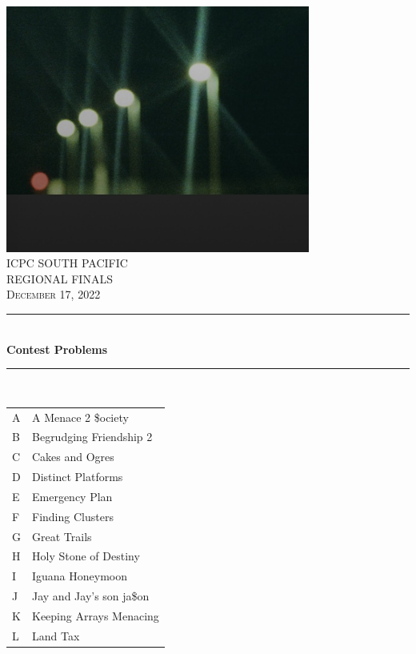 \documentclass[noproblemids,a4paper]{problemset}
\newcommand{\HRule}{\rule{\linewidth}{0.5mm}}
\begin{document}
\thispagestyle{empty}
\begin{center}
\vspace*{\fill}
\includegraphics[width=10cm]{spp_divisions.png} \\

\textsc{\Huge ICPC SOUTH PACIFIC \\[0.3cm] REGIONAL FINALS}\\[0.5cm]

\textsc{\Large December 17, 2022}\\[0.3cm]

\HRule \\[0.3cm]

{ \huge \bfseries Contest Problems \\[0.3cm] }

\HRule \\[0.5cm]

{\large
\begin{tabular}{l@{:\hskip4pt}l}
A & A Menace 2 \$ociety \\
B & Begrudging Friendship 2 \\
C & Cakes and Ogres \\
D & Distinct Platforms \\
E & Emergency Plan \\
F & Finding Clusters \\
G & Great Trails \\
H & Holy Stone of Destiny \\
I & Iguana Honeymoon \\
J & Jay and Jay's son ja\$on \\
K & Keeping Arrays Menacing \\
L & Land Tax \\
\end{tabular}
}
\vspace*{\fill}
\end{center}
\end{document}

